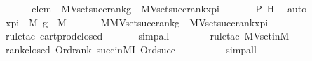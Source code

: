 \begin{isabellebody}
\isanewline
\ \ \ \isamarkupfalse%
\ \isamarkupfalse%
\ {\isachardoublequoteopen}elem\ {\isasymin}\ MVset{\isacharparenleft}{\kern0pt}succ{\isacharparenleft}{\kern0pt}rank{\isacharparenleft}{\kern0pt}g{\isacharparenright}{\kern0pt}{\isacharparenright}{\kern0pt}{\isacharparenright}{\kern0pt}\ {\isasymtimes}\ MVset{\isacharparenleft}{\kern0pt}succ{\isacharparenleft}{\kern0pt}rank{\isacharparenleft}{\kern0pt}x{\isacharunderscore}{\kern0pt}pi{\isacharparenright}{\kern0pt}{\isacharparenright}{\kern0pt}{\isacharparenright}{\kern0pt}{\isachardoublequoteclose}\isanewline
\ \ \ \ \ \isamarkupfalse%
\ P{}\ H\ \isamarkupfalse%
\ auto\ \isanewline
\ \isamarkupfalse%
\isanewline
\ \ \ \isamarkupfalse%
\ {\isachardoublequoteopen}x{\isacharunderscore}{\kern0pt}pi\ {\isasymin}\ M{\isachardoublequoteclose}\ {\isachardoublequoteopen}g\ {\isasymin}\ M{\isachardoublequoteclose}\isanewline
\ \ \ \isamarkupfalse%
\ \isamarkupfalse%
\ {\isachardoublequoteopen}{\isacharparenleft}{\kern0pt}{\isacharhash}{\kern0pt}{\isacharhash}{\kern0pt}M{\isacharparenright}{\kern0pt}{\isacharparenleft}{\kern0pt}MVset{\isacharparenleft}{\kern0pt}succ{\isacharparenleft}{\kern0pt}rank{\isacharparenleft}{\kern0pt}g{\isacharparenright}{\kern0pt}{\isacharparenright}{\kern0pt}{\isacharparenright}{\kern0pt}\ {\isasymtimes}\ MVset{\isacharparenleft}{\kern0pt}succ{\isacharparenleft}{\kern0pt}rank{\isacharparenleft}{\kern0pt}x{\isacharunderscore}{\kern0pt}pi{\isacharparenright}{\kern0pt}{\isacharparenright}{\kern0pt}{\isacharparenright}{\kern0pt}{\isacharparenright}{\kern0pt}{\isachardoublequoteclose}\ \isanewline
\ \ \ \ \ \isamarkupfalse%
\ {\isacharparenleft}{\kern0pt}rule{\isacharunderscore}{\kern0pt}tac\ cartprod{\isacharunderscore}{\kern0pt}closed{\isacharparenright}{\kern0pt}\isanewline
\ \ \ \ \ \isamarkupfalse%
\ simp{\isacharunderscore}{\kern0pt}all\ \isanewline
\ \ \ \ \ \isamarkupfalse%
\ {\isacharparenleft}{\kern0pt}rule{\isacharunderscore}{\kern0pt}tac\ MVset{\isacharunderscore}{\kern0pt}in{\isacharunderscore}{\kern0pt}M{\isacharparenright}{\kern0pt}\ \isanewline
\ \ \ \ \ \isamarkupfalse%
\ rank{\isacharunderscore}{\kern0pt}closed\ Ord{\isacharunderscore}{\kern0pt}rank\ succ{\isacharunderscore}{\kern0pt}in{\isacharunderscore}{\kern0pt}MI\ Ord{\isacharunderscore}{\kern0pt}succ\ \isanewline
\ \ \ \ \ \ \ \isamarkupfalse%
\ simp{\isacharunderscore}{\kern0pt}all\isanewline

\end{isabellebody}
